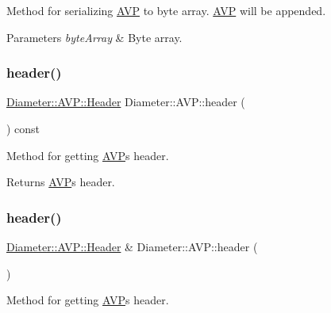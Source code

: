 Method for serializing \hyperlink{classDiameter_1_1AVP}{A\+VP} to byte array. \hyperlink{classDiameter_1_1AVP}{A\+VP} will be appended. 


\begin{DoxyParams}{Parameters}
{\em byte\+Array} & Byte array. \\
\hline
\end{DoxyParams}
\mbox{\label{classDiameter_1_1AVP_aa968a1e25c2b83df6ea774d67534320b}} 
\subsubsection{\texorpdfstring{header()}{header()}\hspace{0.1cm}{\footnotesize\ttfamily [1/2]}}
{\footnotesize\ttfamily \hyperlink{classDiameter_1_1AVP_1_1Header}{Diameter\+::\+A\+V\+P\+::\+Header} Diameter\+::\+A\+V\+P\+::header (\begin{DoxyParamCaption}{ }\end{DoxyParamCaption}) const}



Method for getting \hyperlink{classDiameter_1_1AVP}{A\+VP}\textquotesingle{}s header. 

\begin{DoxyReturn}{Returns}
\hyperlink{classDiameter_1_1AVP}{A\+VP}\textquotesingle{}s header. 
\end{DoxyReturn}
\mbox{\label{classDiameter_1_1AVP_a9636f4defd3f7f65b807940658eda3b4}} 
\subsubsection{\texorpdfstring{header()}{header()}\hspace{0.1cm}{\footnotesize\ttfamily [2/2]}}
{\footnotesize\ttfamily \hyperlink{classDiameter_1_1AVP_1_1Header}{Diameter\+::\+A\+V\+P\+::\+Header} \& Diameter\+::\+A\+V\+P\+::header (\begin{DoxyParamCaption}{ }\end{DoxyParamCaption})}



Method for getting \hyperlink{classDiameter_1_1AVP}{A\+VP}\textquotesingle{}s header. 

